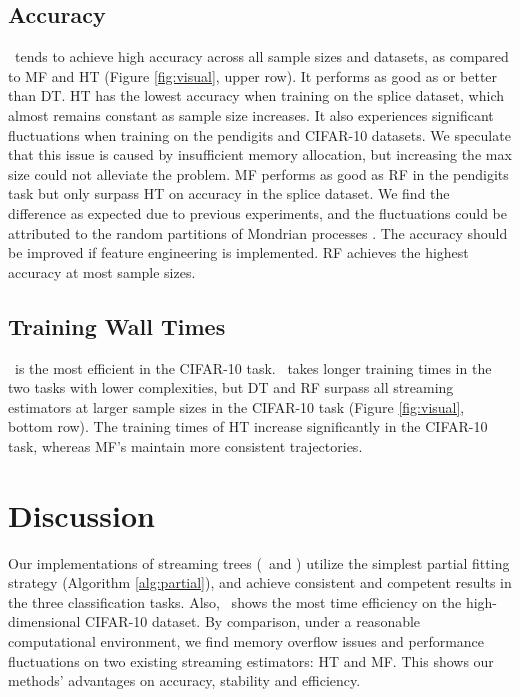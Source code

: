 \subsection{Accuracy}
\SDF~tends to achieve high accuracy across all sample sizes and datasets, as compared to MF and HT (Figure \ref{fig:visual}, upper row). It performs as good as or better than DT. 
HT has the lowest accuracy when training on the splice dataset, which almost remains constant as sample size increases. It also experiences significant fluctuations when training on the pendigits and CIFAR-10 datasets. We speculate that this issue is caused by insufficient memory allocation, but increasing the max size could not alleviate the problem.
MF performs as good as RF in the pendigits task but only surpass HT on accuracy in the splice dataset. We find the difference as expected due to previous experiments, and the fluctuations could be attributed to the random partitions of Mondrian processes \citep{mondrian, roy2009mondrian}. The accuracy should be improved if feature engineering is implemented.
RF achieves the highest accuracy at most sample sizes.

\subsection{Training Wall Times}
\SDT~is the most efficient in the CIFAR-10 task. \SDF~takes longer training times in the two tasks with lower complexities, but DT and RF surpass all streaming estimators at larger sample sizes in the CIFAR-10 task (Figure \ref{fig:visual}, bottom row). The training times of HT increase significantly in the CIFAR-10 task, whereas MF's maintain more consistent trajectories. 

\section{Discussion}
\label{discussion}
Our implementations of streaming trees (\SDT~and \SDF) utilize the simplest partial fitting strategy (Algorithm \ref{alg:partial}), and achieve consistent and competent results in the three classification tasks. Also, \SDT~shows the most time efficiency on the high-dimensional CIFAR-10 dataset. By comparison, under a reasonable computational environment, we find memory overflow issues and performance fluctuations on two existing streaming estimators: HT and MF. This shows our methods' advantages on accuracy, stability and efficiency. 

